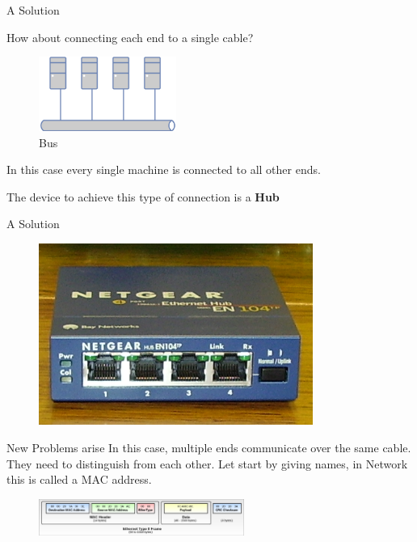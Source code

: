 \documentclass[UTF8]{ctexbeamer}
\begin{document}
\begin{frame}{A Solution}

    How about connecting each end to a single cable?
     \begin{figure}
         \centering
         \includegraphics[width=0.4\textwidth]{Bus.png}
         \caption{Bus}
     \end{figure}
     In this case every single machine is connected to all other ends.
     
     The device to achieve this type of connection is a \textbf{Hub}
     
     
     
\end{frame}

\begin{frame}{A Solution}

    \begin{figure}
        \centering
        \includegraphics[width=0.8\textwidth]{4-port-netgear-ethernet-hub.jpg}
    \end{figure}
    
\end{frame}


\begin{frame}{New Problems arise}
    In this case, multiple ends communicate over the same cable.
    They need to distinguish from each other. \pause
    Let start by giving names, in Network this is called a MAC address.
    \begin{figure}
        \centering
        \includegraphics[width=0.6\textwidth]{Ethernet-Type-II-Frame-format.png}
    \end{figure}
\end{frame}
\end{document}
